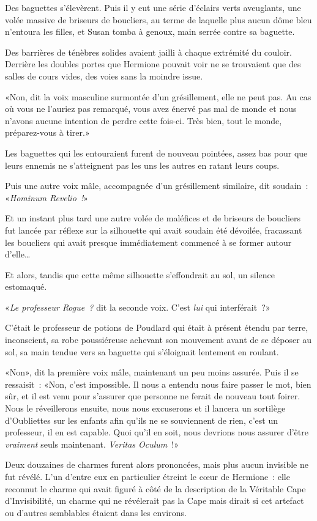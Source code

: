Des baguettes s'élevèrent. Puis il y eut une série d'éclairs verts aveuglants, une volée massive de briseurs de boucliers, au terme de laquelle plus aucun dôme bleu n'entoura les filles, et Susan tomba à genoux, main serrée contre sa baguette.

Des barrières de ténèbres solides avaient jailli à chaque extrémité du couloir. Derrière les doubles portes que Hermione pouvait voir ne se trouvaient que des salles de cours vides, des voies sans la moindre issue.

«Non, dit la voix masculine surmontée d'un grésillement, elle ne peut pas. Au cas où vous ne l'auriez pas remarqué, vous avez énervé pas mal de monde et nous n'avons aucune intention de perdre cette fois-ci. Très bien, tout le monde, préparez-vous à tirer.»

Les baguettes qui les entouraient furent de nouveau pointées, assez bas pour que leurs ennemis ne s'atteignent pas les uns les autres en ratant leurs coups.

Puis une autre voix mâle, accompagnée d'un grésillement similaire, dit soudain~: «\emph{Hominum Revelio~!}»

Et un instant plus tard une autre volée de maléfices et de briseurs de boucliers fut lancée par réflexe sur la silhouette qui avait soudain été dévoilée, fracassant les boucliers qui avait presque immédiatement commencé à se former autour d'elle…

Et alors, tandis que cette même silhouette s'effondrait au sol, un silence estomaqué.

«\emph{Le professeur Rogue~?} dit la seconde voix. C'est \emph{lui} qui interférait~?»

C'était le professeur de potions de Poudlard qui était à présent étendu par terre, inconscient, sa robe poussiéreuse achevant son mouvement avant de se déposer au sol, sa main tendue vers sa baguette qui s'éloignait lentement en roulant.

«Non», dit la première voix mâle, maintenant un peu moins assurée. Puis il se ressaisit~: «Non, c'est impossible. Il nous a entendu nous faire passer le mot, bien sûr, et il est venu pour s'assurer que personne ne ferait de nouveau tout foirer. Nous le réveillerons ensuite, nous nous excuserons et il lancera un sortilège d'Oubliettes sur les enfants afin qu'ils ne se souviennent de rien, c'est un professeur, il en est capable. Quoi qu'il en soit, nous devrions nous assurer d'être \emph{vraiment} seuls maintenant. \emph{Veritas Oculum}~!»

Deux douzaines de charmes furent alors prononcées, mais plus aucun invisible ne fut révélé. L'un d'entre eux en particulier étreint le cœur de Hermione~: elle reconnut le charme qui avait figuré à côté de la description de la Véritable Cape d'Invisibilité, un charme qui ne révélerait pas la Cape mais dirait si cet artefact ou d'autres semblables étaient dans les environs.

